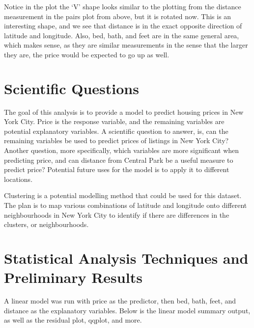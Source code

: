 \documentclass[11pt, a4paper]{article}
\begin{document}
Notice in the plot the `V' shape looks similar to the plotting from the distance measurement in the pairs plot from above, but it is rotated now. This is an interesting shape, and we see that distance is in the exact opposite direction of latitude and longitude. Also, bed, bath, and feet are in the same general area, which makes sense, as they are similar measurements in the sense that the larger they are, the price would be expected to go up as well.

\section{Scientific Questions}

The goal of this analysis is to provide a model to predict housing prices in New York City. Price is the response variable, and the remaining variables are potential explanatory variables. A scientific question to answer, is, can the remaining variables be used to predict prices of listings in New York City? Another question, more specifically, which variables are more significant when predicting price, and can distance from Central Park be a useful measure to predict price? Potential future uses for the model is to apply it to different locations. 
\par
\par
Clustering is a potential modelling method that could be used for this dataset. The plan is to map various combinations of latitude and longitude onto different neighbourhoods in New York City to identify if there are differences in the clusters, or neighbourhoods.

\section{Statistical Analysis Techniques and Preliminary Results}

A linear model was run with price as the predictor, then bed, bath, feet, and distance as the explanatory variables. Below is the linear model summary output, as well as the residual plot, qqplot, and more.
\end{document}
